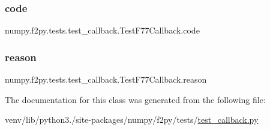 \subsubsection{\texorpdfstring{code}{code}}
{\footnotesize\ttfamily numpy.\+f2py.\+tests.\+test\+\_\+callback.\+Test\+F77\+Callback.\+code\hspace{0.3cm}{\ttfamily [static]}}

\mbox{\label{classnumpy_1_1f2py_1_1tests_1_1test__callback_1_1TestF77Callback_abe546401c603df5719b1edd0520c9416}} 
\subsubsection{\texorpdfstring{reason}{reason}}
{\footnotesize\ttfamily numpy.\+f2py.\+tests.\+test\+\_\+callback.\+Test\+F77\+Callback.\+reason\hspace{0.3cm}{\ttfamily [static]}}



The documentation for this class was generated from the following file\+:\begin{DoxyCompactItemize}
\item 
venv/lib/python3./site-\/packages/numpy/f2py/tests/\hyperlink{test__callback_8py}{test\+\_\+callback.\+py}\end{DoxyCompactItemize}
